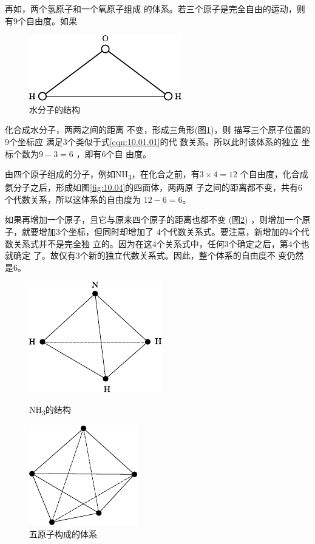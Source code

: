 再如，两个氢原子和一个氧原子组成
的体系。若三个原子是完全自由的运动，则有$ 9 $个自由度。如果

\begin{figure}
    \centering
    \includegraphics{figure/fig10.03}
    \caption{水分子的结构}
    \label{fig:10.03}
\end{figure}
\noindent
化合成水分子，两两之间的距离
不变，形成三角形(图\ref{fig:10.03})，则
描写三个原子位置的9个坐标应
满足$ 3 $个类似于式\eqref{eqn:10.01.01}的代
数关系。所以此时该体系的独立
坐标个数为$  9 - 3 = 6  $ ，即有$ 6 $个自
由度。

由四个原子组成的分子，例如NH\textsubscript{3}，在化合之前，有$  3 \times 4 = 1 2  $
个自由度，化合成氨分子之后，形成如图\ref{fig:10.04}的四面体，两两原
子之间的距离都不变，共有$ 6 $个代数关系，所以这体系的自由度为
$ 1 2 - 6 = 6  $。

如果再增加一个原子，且它与原来四个原子的距离也都不变
(图\ref{fig:10.05})  ，则增加一个原子，就要增加$ 3 $个坐标，但同时却增加了
$ 4 $个代数关系式。要注意，新增加的$ 4 $个代数关系式并不是完全独
立的。因为在这$ 4 $个关系式中，任何$ 3 $个确定之后，第$ 4 $个也就确定
了。故仅有$ 3 $个新的独立代数关系式。因此，整个体系的自由度不
变仍然是$ 6 $。

\clearpage
\begin{figure}[h]
    \begin{minipage}[b]{0.5\linewidth}
        \centering
        \includegraphics{figure/fig10.04}
        \caption{NH\textsubscript{3}的结构}
        \label{fig:10.04}
    \end{minipage}
    \begin{minipage}[b]{0.5\linewidth}
        \centering
        \includegraphics{figure/fig10.05}
        \caption{五原子构成的体系}
        \label{fig:10.05}
    \end{minipage}
\end{figure}

